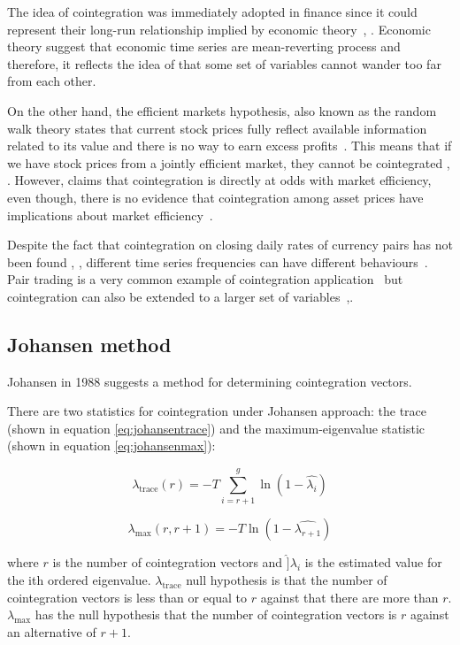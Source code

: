 The idea of cointegration was immediately adopted in finance since it could
represent their long-run relationship implied by economic
theory~\cite{laietAl1991}, \cite{lence+falk2005}.  Economic theory suggest that
economic time series are mean-reverting process and therefore, it reflects the
idea of that some set of variables cannot wander too far from each other. 

On the other hand, the efficient markets hypothesis, also known as the random
walk theory states that current stock prices fully reflect available information
related to its value and there is no way to earn excess profits~\cite{fama1970}.
This means that if we have stock prices from a jointly efficient market, they
cannot be cointegrated \cite{granger1986}, \cite{dwyer1992}. However,
\cite{richards1995} claims that cointegration is directly at odds with market
efficiency, even though, there is no evidence that cointegration among asset
prices have implications about market efficiency~\cite{lence+falk2005}.

Despite the fact that cointegration on closing daily rates of currency pairs has
not been found \cite{coleman1990}, \cite{copeland1991}, different time series
frequencies can have different behaviours~\cite{aldridge2009}. Pair trading is a
very common example of cointegration application~\cite{herlemont2003} but
cointegration can also be extended to a larger set of
variables~\cite{mukherjee1995},\cite{engle2004}.

\subsection{Johansen method}
Johansen in 1988 \cite{johansen1988} suggests a method for determining cointegration vectors. 

There are two statistics for cointegration under Johansen approach: the trace (shown in equation \ref{eq:johansentrace}) and the maximum-eigenvalue statistic (shown in equation \ref{eq:johansenmax}):

\begin{equation}
\label{eq:johansentrace}
\lambda_{\text{trace}} (r) = -T \sum_{i=r+1}^g \ln(1-\hat{\lambda_i})
\end{equation}


\begin{equation}
\label{eq:johansenmax}
\lambda_{\text{max}} (r,r+1) = -T \ln(1-\hat{\lambda_{r+1}})
\end{equation}


\noindent where $r$ is the number of cointegration vectors and $\hat]{\lambda}_i$ is the estimated value for the ith ordered eigenvalue.  $\lambda_{\text{trace}}$ null hypothesis is that the number of cointegration vectors is less than or equal to $r$ against that there are more than $r$. $\lambda_{\text{max}}$ has the null hypothesis that the number of cointegration vectors is $r$ against an alternative of $r
+1$.


